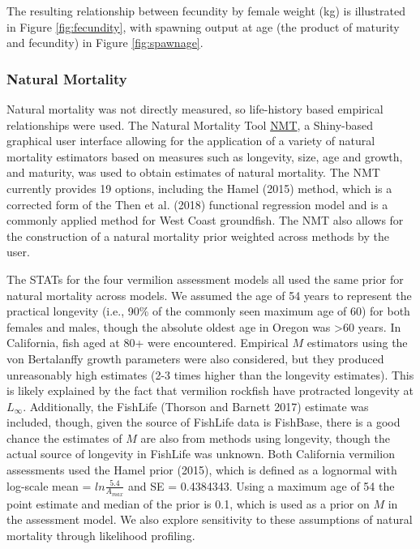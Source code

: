 \documentclass[
  english,
  a4paper,
]{article}
\begin{document}
The resulting relationship between fecundity by female weight (kg) is illustrated in Figure \ref{fig:fecundity}, with spawning output at age (the product of maturity and fecundity) in Figure \ref{fig:spawnage}.

\hypertarget{natural-mortality}{%
\subsubsection{Natural Mortality}\label{natural-mortality}}

Natural mortality was not directly measured, so life-history based empirical
relationships were used. The Natural Mortality Tool
\href{https://github.com/shcaba/Natural-Mortality-Tool}{NMT}, a Shiny-based
graphical user interface allowing for the application of a variety of natural
mortality estimators based on measures such as longevity, size, age and growth,
and maturity, was used to obtain estimates of natural mortality. The NMT currently
provides 19 options, including the Hamel (2015) method, which is a corrected
form of the Then et al. (2018) functional regression model and is a commonly
applied method for West Coast groundfish. The NMT also allows for the construction
of a natural mortality prior weighted across methods by the user.

The STATs for the four vermilion assessment models all used the same prior for
natural mortality across models. We assumed the age of 54 years to represent the practical
longevity (i.e., 90\% of
the commonly seen maximum age of 60) for both females and males, though the absolute
oldest age in Oregon was \textgreater60 years. In California, fish aged at 80+ were encountered.
Empirical \(M\) estimators using the von Bertalanffy growth parameters were also considered, but they produced unreasonably high estimates (2-3 times higher than the longevity estimates). This is likely explained by the fact that vermilion rockfish have protracted longevity at \(L_{\infty}\). Additionally, the FishLife (Thorson and Barnett 2017) estimate was included, though, given
the source of FishLife data is FishBase, there is a good chance the estimates of
\(M\) are also from methods using longevity, though the actual source of longevity
in FishLife was unknown.
Both California vermilion assessments used the Hamel prior (2015), which
is defined as a lognormal with log-scale mean = \(ln\frac{5.4}{A_{max}}\) and SE = 0.4384343.
Using a maximum age of 54 the point estimate and median of the prior is 0.1, which
is used as a prior on \(M\) in the assessment model. We also explore sensitivity to
these assumptions of natural mortality through likelihood profiling.
\end{document}
